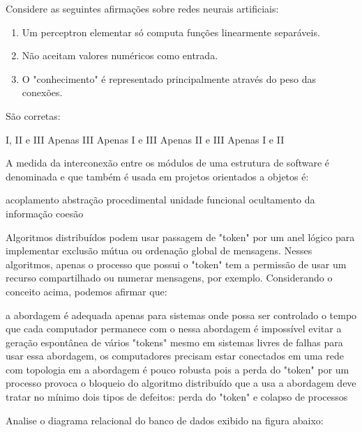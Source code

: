 \documentclass[12pt, addpoints]{exam}
\begin{document}
\begin{questions}
\question

Considere as seguintes afirmações sobre redes neurais artificiais: \begin{enumerate}[label=\Roman*.] \item Um perceptron elementar só computa funções linearmente separáveis. \item Não aceitam valores numéricos como entrada. \item O "conhecimento" é representado principalmente através do peso das conexões. \end{enumerate} São corretas:
\begin{choices}
\choice I, II e III
\choice Apenas III
\choice Apenas I e III
\choice Apenas II e III
\choice Apenas I e II 
\end{choices}

\question

A medida da interconexão entre os módulos de uma estrutura de software é denominada e que também é usada em projetos orientados a objetos é: 
\begin{choices}
\choice acoplamento
\choice abstração procedimental
\choice unidade funcional
\choice ocultamento da informação
\choice coesão
\end{choices}

\question

Algoritmos distribuídos podem usar passagem de "token" por um anel lógico para implementar exclusão mútua ou ordenação global de mensagens. Nesses algoritmos, apenas o processo que possui o "token" tem a permissão de usar um recurso compartilhado ou numerar mensagens, por exemplo. Considerando o conceito acima, podemos afirmar que: 
\begin{choices}
\choice a abordagem é adequada apenas para sistemas onde possa ser controlado o tempo que cada computador permanece com o 
\choice nessa abordagem é impossível evitar a geração espontânea de vários "tokens" mesmo em sistemas livres de falhas 
\choice para usar essa abordagem, os computadores precisam estar conectados em uma rede com topologia em 
\choice a abordagem é pouco robusta pois a perda do "token" por um processo provoca o bloqueio do algoritmo distribuído que a usa 
\choice a abordagem deve tratar no mínimo dois tipos de defeitos: perda do "token" e colapso de processos 
\end{choices}

\question

Analise o diagrama relacional do banco de dados exibido na figura abaixo:


\end{questions}
\end{document}
